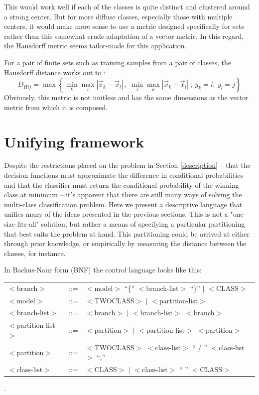 \documentclass{article}
\begin{document}
This would work well if each of the classes is quite distinct and clustered around a strong center.
But for more diffuse classes, especially those with multiple centers, it would make more sense to use a metric designed specifically for sets rather than this somewhat crude adaptation of a vector metric.
In this regard, the Hausdorff metric seems tailor-made for this application.

For a pair of finite sets such as training samples from a pair of classes,
the Hausdorff distance works out to \citep{Ott1993, Gulick1992}:
\begin{equation}
D_{Hij} = \max \left \lbrace \min_k \max_l | \vec x_k - \vec x_l|~,~\min_l \max_k | \vec x_k - \vec x_l| ~ ;~y_k=i;~y_l=j \right \rbrace
\end{equation}
Obviously, this metric is not unitless and has the same dimensions as the
vector metric from which it is composed.

\section{Unifying framework}

Despite the restrictions placed on the problem in Section \ref{description}
-- that the decision functions must approximate the difference in conditional
probabilities and that the classifier must return the conditional probability
of the winning class at minimum -- it's apparent that there are still many ways
of solving the multi-class classification problem.
Here we present a descriptive language that unifies many of the ideas presented
in the previous sections.
This is not a "one-size-fits-all" solution, but rather a means of specifying
a particular partitioning that best suits the problem at hand.
This partitioning could be arrived at either through prior knowledge, 
or empirically by measuring the distance between the classes, for instance.

In Backus-Naur form (BNF) the control language looks like this:

\begin{tabular}{lcl}
$<$branch$>$ & ::= & $<$model$>$ ``\{'' $<$branch-list$>$ ``\}'' $|$ $<$CLASS$>$\\
$<$model$>$  & ::= & $<$TWOCLASS$>$ $|$ $<$partition-list$>$\\
$<$branch-list$>$ & ::= & $<$branch$>$ $|$ $<$branch-list$>$ $<$branch$>$\\
$<$partition-list$>$ & ::= & $<$partition$>$ $|$ $<$partition-list$>$ $<$partition$>$\\
$<$partition$>$ & ::= & $<$TWOCLASS$>$ $<$class-list$>$ `` / '' $<$class-list$>$ ``;''\\
$<$class-list$>$ & ::= & $<$CLASS$>$ $|$ $<$class-list$>$ `` '' $<$CLASS$>$
\end{tabular}.
\end{document}
